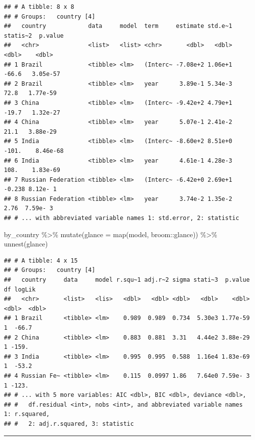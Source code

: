 \documentclass[
]{article}
\newenvironment{Shaded}{\begin{snugshade}}{\end{snugshade}}
\newcommand{\AttributeTok}[1]{\textcolor[rgb]{0.77,0.63,0.00}{#1}}
\newcommand{\FunctionTok}[1]{\textcolor[rgb]{0.00,0.00,0.00}{#1}}
\newcommand{\NormalTok}[1]{#1}
\newcommand{\SpecialCharTok}[1]{\textcolor[rgb]{0.00,0.00,0.00}{#1}}
\begin{document}
\begin{verbatim}
## # A tibble: 8 x 8
## # Groups:   country [4]
##   country            data     model  term     estimate std.e~1 statis~2  p.value
##   <chr>              <list>   <list> <chr>       <dbl>   <dbl>    <dbl>    <dbl>
## 1 Brazil             <tibble> <lm>   (Interc~ -7.08e+2 1.06e+1  -66.6   3.05e-57
## 2 Brazil             <tibble> <lm>   year      3.89e-1 5.34e-3   72.8   1.77e-59
## 3 China              <tibble> <lm>   (Interc~ -9.42e+2 4.79e+1  -19.7   1.32e-27
## 4 China              <tibble> <lm>   year      5.07e-1 2.41e-2   21.1   3.88e-29
## 5 India              <tibble> <lm>   (Interc~ -8.60e+2 8.51e+0 -101.    8.46e-68
## 6 India              <tibble> <lm>   year      4.61e-1 4.28e-3  108.    1.83e-69
## 7 Russian Federation <tibble> <lm>   (Interc~ -6.42e+0 2.69e+1   -0.238 8.12e- 1
## 8 Russian Federation <tibble> <lm>   year      3.74e-2 1.35e-2    2.76  7.59e- 3
## # ... with abbreviated variable names 1: std.error, 2: statistic
\end{verbatim}

\begin{Shaded}
\begin{Highlighting}[]
\NormalTok{by\_country }\SpecialCharTok{\%\textgreater{}\%} 
  \FunctionTok{mutate}\NormalTok{(}\AttributeTok{glance =} \FunctionTok{map}\NormalTok{(model, broom}\SpecialCharTok{::}\NormalTok{glance)) }\SpecialCharTok{\%\textgreater{}\%} 
  \FunctionTok{unnest}\NormalTok{(glance)}
\end{Highlighting}
\end{Shaded}

\begin{verbatim}
## # A tibble: 4 x 15
## # Groups:   country [4]
##   country     data     model r.squ~1 adj.r~2 sigma stati~3  p.value    df logLik
##   <chr>       <list>   <lis>   <dbl>   <dbl> <dbl>   <dbl>    <dbl> <dbl>  <dbl>
## 1 Brazil      <tibble> <lm>    0.989  0.989  0.734  5.30e3 1.77e-59     1  -66.7
## 2 China       <tibble> <lm>    0.883  0.881  3.31   4.44e2 3.88e-29     1 -159. 
## 3 India       <tibble> <lm>    0.995  0.995  0.588  1.16e4 1.83e-69     1  -53.2
## 4 Russian Fe~ <tibble> <lm>    0.115  0.0997 1.86   7.64e0 7.59e- 3     1 -123. 
## # ... with 5 more variables: AIC <dbl>, BIC <dbl>, deviance <dbl>,
## #   df.residual <int>, nobs <int>, and abbreviated variable names 1: r.squared,
## #   2: adj.r.squared, 3: statistic
\end{verbatim}

\begin{center}\rule{0.5\linewidth}{0.5pt}\end{center}
\end{document}
